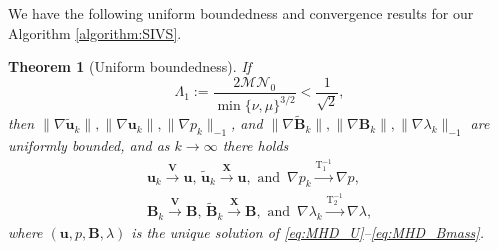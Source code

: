 \documentclass[3p]{elsarticle}
\newtheorem{theorem}{Theorem}
\def\V#1{\mathbf{#1}}
\def\Vt#1{\mathbf{\tilde{#1}}}
\newcommand{\Mbd}{\mathcal{M}}
\newcommand{\Nbd}{\mathcal{N}}
\newcommand{\Luinvmap}{\mathrm{T_1^{-1}}}
\newcommand{\Lbinvmap}{\mathrm{T_2^{-1}}}
\begin{document}
We have the following uniform boundedness and convergence results for our Algorithm \ref{algorithm:SIVS}.
\begin{theorem}[Uniform boundedness]\label{boundedness}
If 
%
\begin{equation}
	\Lambda_1 := \frac{2\Mbd \Nbd_0}{\min\{\nu,\mu\}^{3/2}} < \frac{1}{\sqrt{2}} \label{eq:smalldata},    
\end{equation}
%
%
then $\| \nabla \Vt{u}_k\|, \| \nabla \V{u}_k\| , \| \nabla p_k\|_{-1}$, and  $\| \nabla \Vt{B}_k\|, \| \nabla \V{B}_k\| , \| \nabla \lambda_k\|_{-1}$ are uniformly bounded, and as $k \rightarrow \infty$ there holds 
\begin{equation}
    \label{eq:ErrConv_Els}
    \begin{aligned}
\V{u}_k \xrightarrow{\V{V}} \V{u}, \, \Vt{u}_k \xrightarrow{\V{X}} \V{u}, \text{ and } \, \nabla p_k \xrightarrow{\Luinvmap} \nabla p, \\
\V{B}_k \xrightarrow{\V{V}} \V{B}, \, \Vt{B}_k \xrightarrow{\V{X}} \V{B}, \text{ and } \, \nabla \lambda_k \xrightarrow{\Lbinvmap} \nabla \lambda,
    \end{aligned}
\end{equation}
where $(\V{u},p,\V{B},\lambda)$ is the unique solution of  \eqref{eq:MHD_U}--\eqref{eq:MHD_Bmass}.
\end{theorem} 
%
%
\end{document}
